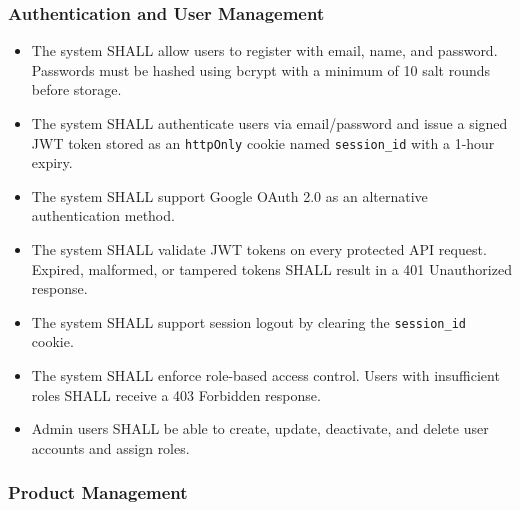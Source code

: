 \documentclass[12pt,onecolumn]{IEEEtran}
\begin{document}
\subsubsection{Authentication and User Management}

\begin{tcolorbox}[reqbox,title={FR-AUTH: Authentication Requirements}]
\begin{itemize}[leftmargin=1.5em]
  \item {} The system SHALL allow users to register with email, name, and password. Passwords must be hashed using bcrypt with a minimum of 10 salt rounds before storage.
  \item {} The system SHALL authenticate users via email/password and issue a signed JWT token stored as an \texttt{httpOnly} cookie named \texttt{session\_id} with a 1-hour expiry.
  \item {} The system SHALL support Google OAuth 2.0 as an alternative authentication method.
  \item {} The system SHALL validate JWT tokens on every protected API request. Expired, malformed, or tampered tokens SHALL result in a 401 Unauthorized response.
  \item {} The system SHALL support session logout by clearing the \texttt{session\_id} cookie.
  \item {} The system SHALL enforce role-based access control. Users with insufficient roles SHALL receive a 403 Forbidden response.
  \item {} Admin users SHALL be able to create, update, deactivate, and delete user accounts and assign roles.
\end{itemize}
\end{tcolorbox}

\subsubsection{Product Management}
\end{document}
